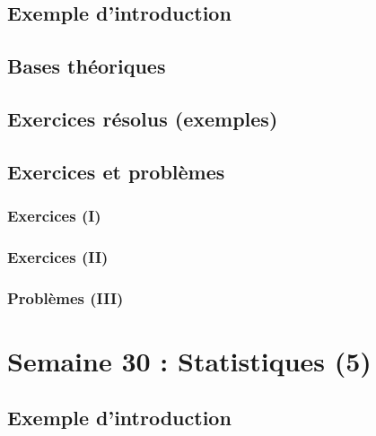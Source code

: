 \documentclass[
  12pt,
]{book}
\begin{document}
\hypertarget{exemple-dintroduction-28}{%
\section{Exemple d'introduction}\label{exemple-dintroduction-28}}

\hypertarget{bases-thuxe9oriques-28}{%
\section{Bases théoriques}\label{bases-thuxe9oriques-28}}

\hypertarget{exercices-ruxe9solus-exemples-28}{%
\section{Exercices résolus (exemples)}\label{exercices-ruxe9solus-exemples-28}}

\hypertarget{exercices-et-probluxe8mes-28}{%
\section{Exercices et problèmes}\label{exercices-et-probluxe8mes-28}}

\hypertarget{exercices-i-28}{%
\subsection{Exercices (I)}\label{exercices-i-28}}

\hypertarget{exercices-ii-28}{%
\subsection{Exercices (II)}\label{exercices-ii-28}}

\hypertarget{probluxe8mes-iii-28}{%
\subsection{Problèmes (III)}\label{probluxe8mes-iii-28}}

\hypertarget{semaine-30-statistiques-5}{%
\chapter{Semaine 30 : Statistiques (5)}\label{semaine-30-statistiques-5}}

\hypertarget{exemple-dintroduction-29}{%
\section{Exemple d'introduction}\label{exemple-dintroduction-29}}
\end{document}
